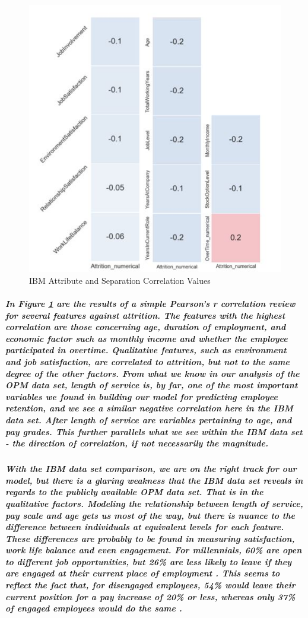 \documentclass[10pt]{article}
\begin{document}
\subparagraph{}
\begin{figure}[H]
\centering
\includegraphics[width=.8\linewidth]{IBMSepCorr.jpg}
\caption{IBM Attribute and Separation Correlation Values}
\label{fig:IBMSepCorr}
\end{figure}


\subparagraph{In Figure \ref{fig:IBMSepCorr} are the results of a simple Pearson's r correlation review for several features against attrition. The features with the highest correlation are those concerning age, duration of employment, and economic factor such as monthly income and whether the employee participated in overtime. Qualitative features, such as environment and job satisfaction, are correlated to attrition, but not to the same degree of the other factors. From what we know in our analysis of the OPM data set, length of service is, by far, one of the most important variables we found in building our model for predicting employee retention, and we see a similar negative correlation here in the IBM data set. After length of service are variables pertaining to age, and pay grades. This further parallels what we see within the IBM data set - the direction of correlation, if not necessarily the magnitude.}

\subparagraph{With the IBM data set comparison, we are on the right track for our model, but there is a glaring weakness that the IBM data set reveals in regards to the publicly available OPM data set. That is in the qualitative factors. Modeling the relationship between length of service, pay scale and age gets us most of the way, but there is nuance to the difference between individuals at equivalent levels for each feature.  These differences are probably to be found in measuring satisfaction, work life balance and even engagement. For millennials, 60\% are open to different job opportunities, but 26\% are less likely to leave if they are engaged at their current place of employment \cite{gallup}. This seems to reflect the fact that, for disengaged employees, 54\% would leave their current position for a pay increase of 20\% or less, whereas only 37\% of engaged employees would do the same \cite{gallup2}.}
\end{document}
